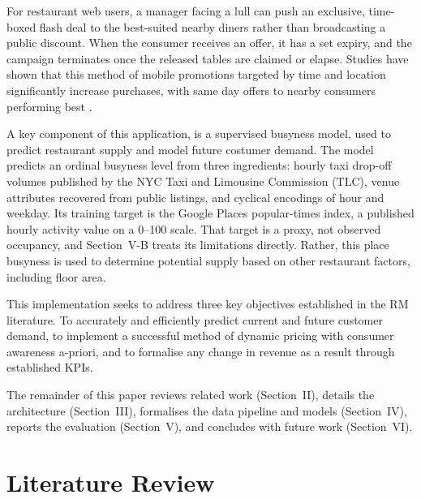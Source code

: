 \documentclass[conference]{IEEEtran}
\begin{document}
For restaurant web users, a manager facing a lull can push an exclusive, time-boxed flash deal to the best-suited nearby diners rather than broadcasting a public discount. When the consumer receives an offer, it has a set expiry, and the campaign terminates once the released tables are claimed or elapse. Studies have shown that this method of mobile promotions targeted by time and location significantly increase purchases, with same day offers to nearby consumers performing best \cite{fong2015geo}.

A key component of this application, is a supervised busyness model, used to predict restaurant supply and model future costumer demand. The model predicts an ordinal busyness level from three ingredients: hourly taxi drop-off volumes published by the NYC Taxi and Limousine Commission (TLC), venue attributes recovered from public listings, and cyclical encodings of hour and weekday. Its training target is the Google Places popular-times index, a published hourly activity value on a 0--100 scale. That target is a proxy, not observed occupancy, and Section~V-B treats its limitations directly.  Rather, this place busyness is used to determine potential supply based on other restaurant factors, including floor area.

This implementation seeks to address three key objectives established in the RM literature. To accurately and efficiently predict current and future customer demand, to implement a successful method of dynamic pricing with consumer awareness a-priori, and to formalise any change in revenue as a result through established KPIs.

The remainder of this paper reviews related work (Section~II), details the architecture (Section~III), formalises the data pipeline and models (Section~IV), reports the evaluation (Section~V), and concludes with future work (Section~VI).

\section{Literature Review}
\end{document}
